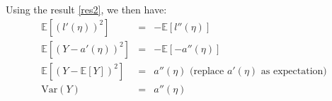 \begin{answer}
Using the result \eqref{res2}, we then have:
\begin{eqnarray}
	\mathbb{E}[(l'(\eta))^2] &=& - \mathbb{E}[l''(\eta)] \\
	\mathbb{E}[(Y - a'(\eta))^2] &=& - \mathbb{E}[-a''(\eta)] \\
	\mathbb{E}[(Y - \mathbb{E}[Y])^2] &=& a''(\eta) \text{ (replace $a'(\eta)$ as expectation)} \\
	\text{Var}(Y) &=& a''(\eta)
\end{eqnarray} \\
\end{answer}
